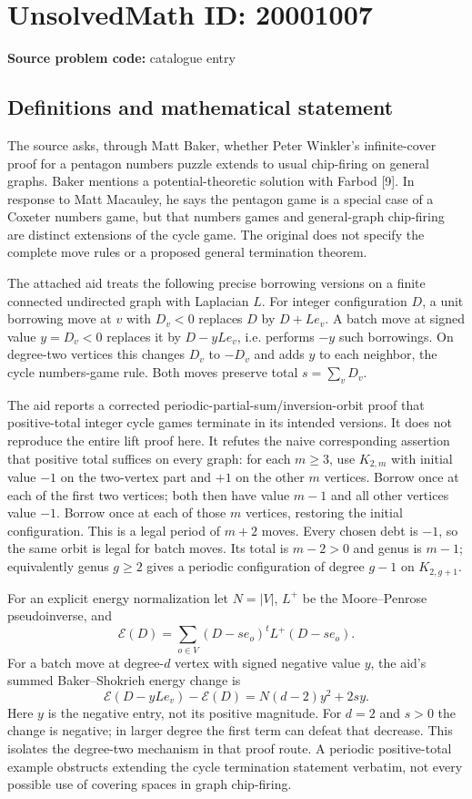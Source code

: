 \documentclass[11pt]{article}
\begin{document}
\section*{UnsolvedMath ID: 20001007}
\textbf{Source problem code:} catalogue entry
\subsection{Definitions and mathematical statement}
The source asks, through Matt Baker, whether Peter Winkler's infinite-cover proof for a pentagon numbers puzzle extends to usual chip-firing on general graphs. Baker mentions a potential-theoretic solution with Farbod [9]. In response to Matt Macauley, he says the pentagon game is a special case of a Coxeter numbers game, but that numbers games and general-graph chip-firing are distinct extensions of the cycle game. The original does not specify the complete move rules or a proposed general termination theorem.

The attached aid treats the following precise borrowing versions on a finite connected undirected graph with Laplacian $L$. For integer configuration $D$, a unit borrowing move at $v$ with $D_v<0$ replaces $D$ by $D+Le_v$. A batch move at signed value $y=D_v<0$ replaces it by $D-yLe_v$, i.e. performs $-y$ such borrowings. On degree-two vertices this changes $D_v$ to $-D_v$ and adds $y$ to each neighbor, the cycle numbers-game rule. Both moves preserve total $s=\sum_vD_v$.

The aid reports a corrected periodic-partial-sum/inversion-orbit proof that positive-total integer cycle games terminate in its intended versions. It does not reproduce the entire lift proof here. It refutes the naive corresponding assertion that positive total suffices on every graph: for each $m\ge3$, use $K_{2,m}$ with initial value $-1$ on the two-vertex part and $+1$ on the other $m$ vertices. Borrow once at each of the first two vertices; both then have value $m-1$ and all other vertices value $-1$. Borrow once at each of those $m$ vertices, restoring the initial configuration. This is a legal period of $m+2$ moves. Every chosen debt is $-1$, so the same orbit is legal for batch moves. Its total is $m-2>0$ and genus is $m-1$; equivalently genus $g\ge2$ gives a periodic configuration of degree $g-1$ on $K_{2,g+1}$.

For an explicit energy normalization let $N=|V|$, $L^+$ be the Moore--Penrose pseudoinverse, and
\[
\mathcal E(D)=\sum_{o\in V}(D-se_o)^tL^+(D-se_o).
\]
For a batch move at degree-$d$ vertex with signed negative value $y$, the aid's summed Baker--Shokrieh energy change is
\[
\mathcal E(D-yLe_v)-\mathcal E(D)=N(d-2)y^2+2sy.
\]
Here $y$ is the negative entry, not its positive magnitude. For $d=2$ and $s>0$ the change is negative; in larger degree the first term can defeat that decrease. This isolates the degree-two mechanism in that proof route. A periodic positive-total example obstructs extending the cycle termination statement verbatim, not every possible use of covering spaces in graph chip-firing.
\end{document}

